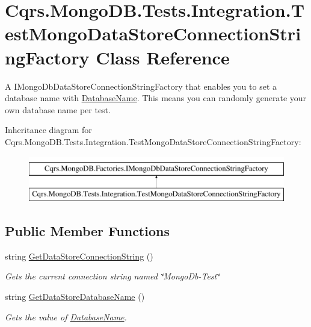\hypertarget{classCqrs_1_1MongoDB_1_1Tests_1_1Integration_1_1TestMongoDataStoreConnectionStringFactory}{}\section{Cqrs.\+Mongo\+D\+B.\+Tests.\+Integration.\+Test\+Mongo\+Data\+Store\+Connection\+String\+Factory Class Reference}
\label{classCqrs_1_1MongoDB_1_1Tests_1_1Integration_1_1TestMongoDataStoreConnectionStringFactory}


A I\+Mongo\+Db\+Data\+Store\+Connection\+String\+Factory that enables you to set a database name with \hyperlink{classCqrs_1_1MongoDB_1_1Tests_1_1Integration_1_1TestMongoDataStoreConnectionStringFactory_a2d26a00fd14aad6718b48d515ac30ff9_a2d26a00fd14aad6718b48d515ac30ff9}{Database\+Name}. This means you can randomly generate your own database name per test.  


Inheritance diagram for Cqrs.\+Mongo\+D\+B.\+Tests.\+Integration.\+Test\+Mongo\+Data\+Store\+Connection\+String\+Factory\+:\begin{figure}[H]
\begin{center}
\leavevmode
\includegraphics[height=2.000000cm]{classCqrs_1_1MongoDB_1_1Tests_1_1Integration_1_1TestMongoDataStoreConnectionStringFactory}
\end{center}
\end{figure}
\subsection*{Public Member Functions}
\begin{DoxyCompactItemize}
\item 
string \hyperlink{classCqrs_1_1MongoDB_1_1Tests_1_1Integration_1_1TestMongoDataStoreConnectionStringFactory_a520a0722aa91ed6144e4e86213ea13da_a520a0722aa91ed6144e4e86213ea13da}{Get\+Data\+Store\+Connection\+String} ()
\begin{DoxyCompactList}\small\item\em Gets the current connection string named \char`\"{}\+Mongo\+Db-\/\+Test\char`\"{} \end{DoxyCompactList}\item 
string \hyperlink{classCqrs_1_1MongoDB_1_1Tests_1_1Integration_1_1TestMongoDataStoreConnectionStringFactory_a1f362a8cdae3f0fb7b8a51f62f7611f3_a1f362a8cdae3f0fb7b8a51f62f7611f3}{Get\+Data\+Store\+Database\+Name} ()
\begin{DoxyCompactList}\small\item\em Gets the value of \hyperlink{classCqrs_1_1MongoDB_1_1Tests_1_1Integration_1_1TestMongoDataStoreConnectionStringFactory_a2d26a00fd14aad6718b48d515ac30ff9_a2d26a00fd14aad6718b48d515ac30ff9}{Database\+Name}. \end{DoxyCompactList}\end{DoxyCompactItemize}
